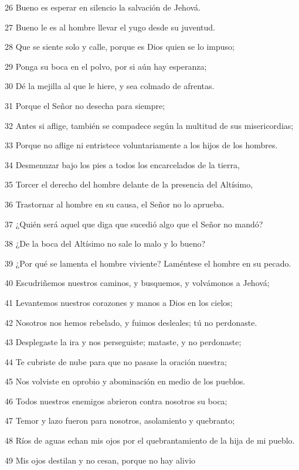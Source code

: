 \par 26 Bueno es esperar en silencio la salvación de Jehová.
\par 27 Bueno le es al hombre llevar el yugo desde su juventud.
\par 28 Que se siente solo y calle, porque es Dios quien se lo impuso;
\par 29 Ponga su boca en el polvo, por si aún hay esperanza;
\par 30 Dé la mejilla al que le hiere, y sea colmado de afrentas.
\par 31 Porque el Señor no desecha para siempre;
\par 32 Antes si aflige, también se compadece según la multitud de sus misericordias;
\par 33 Porque no aflige ni entristece voluntariamente a los hijos de los hombres.
\par 34 Desmenuzar bajo los pies a todos los encarcelados de la tierra,
\par 35 Torcer el derecho del hombre delante de la presencia del Altísimo,
\par 36 Trastornar al hombre en su causa, el Señor no lo aprueba.
\par 37 ¿Quién será aquel que diga que sucedió algo que el Señor no mandó?
\par 38 ¿De la boca del Altísimo no sale lo malo y lo bueno?
\par 39 ¿Por qué se lamenta el hombre viviente? Laméntese el hombre en su pecado.
\par 40 Escudriñemos nuestros caminos, y busquemos, y volvámonos a Jehová;
\par 41 Levantemos nuestros corazones y manos a Dios en los cielos;
\par 42 Nosotros nos hemos rebelado, y fuimos desleales; tú no perdonaste.
\par 43 Desplegaste la ira y nos perseguiste; mataste, y no perdonaste;
\par 44 Te cubriste de nube para que no pasase la oración nuestra;
\par 45 Nos volviste en oprobio y abominación en medio de los pueblos.
\par 46 Todos nuestros enemigos abrieron contra nosotros su boca;
\par 47 Temor y lazo fueron para nosotros, asolamiento y quebranto;
\par 48 Ríos de aguas echan mis ojos por el quebrantamiento de la hija de mi pueblo.
\par 49 Mis ojos destilan y no cesan, porque no hay alivio

